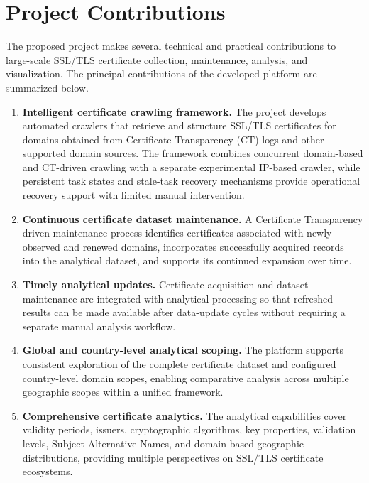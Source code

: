 \section{Project Contributions}
\label{sec:contributions}

The proposed project makes several technical and practical contributions to large-scale
SSL/TLS certificate collection, maintenance, analysis, and visualization. The
principal contributions of the developed platform are summarized below.

\begin{enumerate}[label=\arabic*.,leftmargin=0.42in]
  \item \textbf{Intelligent certificate crawling framework.} The project develops automated crawlers that retrieve and structure SSL/TLS certificates for domains obtained from Certificate Transparency (CT) logs and other supported domain sources. The framework combines concurrent domain-based and CT-driven crawling with a separate experimental IP-based crawler, while persistent task states and stale-task recovery mechanisms provide operational recovery support with limited manual intervention.

  \item \textbf{Continuous certificate dataset maintenance.} A Certificate Transparency driven maintenance process identifies certificates associated with newly observed and renewed domains, incorporates successfully acquired records into the analytical dataset, and supports its continued expansion over time.

  \item \textbf{Timely analytical updates.} Certificate acquisition and dataset maintenance are integrated with analytical processing so that refreshed results can be made available after data-update cycles without requiring a separate manual analysis workflow.

  \item \textbf{Global and country-level analytical scoping.} The platform supports consistent exploration of the complete certificate dataset and configured country-level domain scopes, enabling comparative analysis across multiple geographic scopes within a unified framework.

  \item \textbf{Comprehensive certificate analytics.} The analytical capabilities cover validity periods, issuers, cryptographic algorithms, key properties, validation levels, Subject Alternative Names, and domain-based geographic distributions, providing multiple perspectives on SSL/TLS certificate ecosystems.


\end{enumerate}
